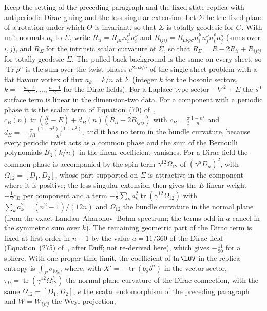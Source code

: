 Keep the setting of the preceding paragraph and the fixed-state replica with antiperiodic Dirac gluing and the less singular extension. Let \(\Sigma\) be the fixed plane of a rotation under which \(\Theta\) is invariant, so that \(\Sigma\) is totally geodesic for \(G\). With unit normals \(n_i\) to \(\Sigma\), write \(R_{ii}=R_{\mu\nu}n^\mu_in^\nu_i\) and \(R_{ijij}=R_{\mu\nu\rho\sigma}n^\mu_in^\nu_jn^\rho_in^\sigma_j\) (sums over \(i,j\)), and \(R_\Sigma\) for the intrinsic scalar curvature of \(\Sigma\), so that \(R_\Sigma=R-2R_{ii}+R_{ijij}\) for totally geodesic \(\Sigma\). The pulled-back background is the same on every sheet, so \(\operatorname{Tr}\rho^n\) is the sum over the twist phases \(e^{2\pi\mathrm ik/n}\) of the single-sheet problem with a flat flavour vortex of flux \(a_k=k/n\) at \(\Sigma\) (integer \(k\) for the bosonic sectors, \(k=-\tfrac{n-1}2,\dots,\tfrac{n-1}2\) for the Dirac fields). For a Laplace-type sector \(-\nabla^2+E\) the \(s^0\) surface term is linear in the dimension-two data. For a component with a periodic phase it is the scalar term of Equation~(70) of~\cite{Solodukhin2011}, \(c_B(n)\operatorname{tr}(\tfrac R6-E)+d_B(n)(R_{ii}-2R_{ijij})\) with \(c_B=\tfrac\pi3\tfrac{1-n^2}n\) and \(d_B=-\tfrac\pi{180}\tfrac{(1-n^2)(1+n^2)}{n^3}\), and it has no term in the bundle curvature, because every periodic twist acts as a common phase and the sum of the Bernoulli polynomials \(B_3(k/n)\) in the linear coefficient vanishes. For a Dirac field the common phase is accompanied by the spin term \(\gamma^{12}\Omega_{12}\) of \((\gamma^\mu D_\mu)^2\), with \(\Omega_{12}=[D_1,D_2]\), whose part supported on \(\Sigma\) is attractive in the component where it is positive; the less singular extension then gives the \(E\)-linear weight \(-\tfrac12c_B\) per component and a term \(-\tfrac12\sum_ka_k^2\operatorname{tr}(\gamma^{12}\Omega_{12})\) with \(\sum_ka_k^2=(n^2-1)/(12n)\) and \(\Omega_{12}\) the bundle curvature in the normal plane (from the exact Landau--Aharonov--Bohm spectrum; the terms odd in \(a\) cancel in the symmetric sum over \(k\)). The remaining geometric part of the Dirac term is fixed at first order in \(n-1\) by the value \(a=11/360\) of the Dirac field (Equation~(275) of~\cite{Solodukhin2011}, after Duff; not re-derived here), which gives \(-\tfrac{11}{90}\) for a sphere. With one proper-time limit, the coefficient of \(\ln\LUV\) in the replica entropy is \(\int_\Sigma\sigma_{\log}\), where, with \(X'=-\operatorname{tr}(b_\sigma b^\sigma)\) in the vector sector, \(\tau_\Omega=\operatorname{tr}(\gamma^{12}\Omega^{f}_{12})\) the normal-plane curvature of the Dirac connection, with the same \(\Omega_{12}=[D_1,D_2]\), \(e\) the scalar endomorphism of the preceding paragraph and \(W=W_{ijij}\) the Weyl projection,

